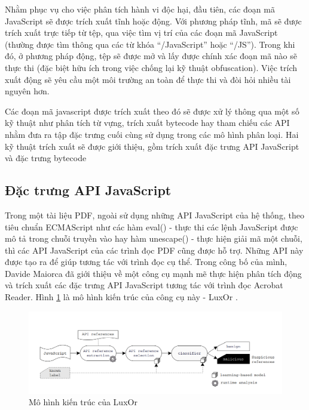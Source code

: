 \documentclass[./../main.tex]{subfiles}
\begin{document}
Nhằm phục vụ cho việc phân tích hành vi độc hại, đầu tiên, các đoạn mã JavaScript sẽ được trích xuất tĩnh hoặc động. Với phương pháp tĩnh, mã sẽ được trích xuất trực tiếp từ tệp, qua việc tìm vị trí của các đoạn mã JavaScript (thường được tìm thông qua các từ khóa “/JavaScript” hoặc “/JS”). Trong khi đó, ở phương pháp động, tệp sẽ được mở và lấy được chính xác đoạn mã nào sẽ thực thi (đặc biệt hữu ích trong việc chống lại kỹ thuật obfuscation). Việc trích xuất động sẽ yêu cầu một môi trường an toàn để thực thi và đòi hỏi nhiều tài nguyên hơn.


Các đoạn mã javascript được trích xuất theo đó sẽ được xử lý thông qua một số kỹ thuật như phân tích từ vựng, trích xuất bytecode hay tham chiếu các API nhằm đưa ra tập đặc trưng cuối cùng sử dụng trong các mô hình phân loại. Hai kỹ thuật trích xuất sẽ được giới thiệu, gồm trích xuất đặc trưng API JavaScript và đặc trưng bytecode

\subsection{Đặc trưng API JavaScript}

Trong một tài liệu PDF, ngoài sử dụng những API JavaScript của hệ thống, theo tiêu chuẩn ECMAScript như các hàm eval() - thực thi các lệnh JavaScript được mô tả trong chuỗi truyền vào hay hàm unescape() - thực hiện giải mã một chuỗi, thì các API JavaScript của các trình đọc PDF cũng được hỗ trợ. Những API này được tạo ra để giúp tương tác với trình đọc cụ thể. Trong công bố của mình, Davide Maiorca đã giới thiệu về một công cụ mạnh mẽ thực hiện phân tích động và trích xuất các đặc trưng API JavaScript tương tác với trình đọc Acrobat Reader. Hình \ref{fig:luxor} là mô hình kiến trúc của công cụ này - LuxOr \cite{luxor}.

\begin{figure}[H]
	\centering
	\includegraphics[width=\linewidth]{./images/luxOr.png}
	\caption{Mô hình kiến trúc của LuxOr \cite{luxor}}
	\label{fig:luxor}
\end{figure}
\end{document}
